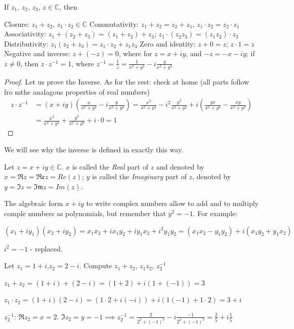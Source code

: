 \documentclass[12pt]{article}
\providecommand{\emphw}[1]{}%
\renewcommand{\emphw}[1]{{\textcolor{almostblack}{\emph{#1}}}}%
\begin{document}
\begin{proposition}
   If $z_1$, $z_2$, $z_3$, $z\in \mathbb{C}$, then

   \begin{enumerate}
      \ii Closure: $z_1+z_2$, $z_1\cdot z_2 \in\mathbb{C}$
      \ii Commutativity: $z_1+z_2 = z_2+z_1$, $z_1\cdot z_2 = z_2\cdot z_1$
      \ii Associativity: $z_1+(z_2+z_3) = (z_1+z_2)+z_3$; $z_1\cdot (z_2z_3)=(z_1z_2)\cdot z_3$
      \ii Distributivity: $z_1(z_2+z_3)=z_1\cdot z_2+z_1z_3$
      \ii Zero and identity: $z+0 = z$; $z\cdot 1 = z$
      \ii Negative and inverse: $z+(-z)=0$, where for $z=x+iy$, and $-z=-x-iy$; if $z\neq 0$, then $z\cdot z^{-1} = 1$, where $z^{-1} = \frac 1z=\frac {1}{x^2+y^2}-i\frac y{x^2+y^2}$
   \end{enumerate}
\end{proposition}
\begin{proof}
   Let us prove the Inverse. As for the rest: check at home (all parts follow fro mthe analagous properties of real numbers)
   \begin{align*} 
      z\cdot z^{-1} &= (x+iy)\left(\frac x{x^2+y^2}-i\frac y{x^2+y^2}\right) = \frac {x^2}{x^2+y^2}-i^2\frac {y^2}{x^2+y^2} + i\left(\frac {yx}{x^2+y^2}-\frac {xy}{x^2+y^2}\right) \\ 
      &=\frac {x^2}{x^2+y^2}+\frac {y^2}{x^2+y^2}+i\cdot 0 = 1
   \end{align*}
\end{proof}

We will see why the inverse is defined in exactly this way.
\begin{definition}
   Let $z=x+iy \in \mathbb{C}$. $x$ is called the \emphw{Real} part of $z$ and denoted by $x = \Re{z} = \mathfrak{Re} z = Re(z)$; $y$ is called the \emphw{Imaginary} part of $z$, denoted by $y=\Im z = \mathfrak{Im}z = Im(z)$.
\end{definition}

The algebraic form $x+iy$ to write complex numbers allow to add and to multiply comple numbers as polynomials, but remember that $y^2=-1$. For example:
\begin{example}
   $(x_1+iy_1)(x_2+iy_2) = x_1x_2+ix_1y_2+iy_1x_2+i^2y_1y_2 = (x_1x_2-y_1y_2) + i(x_1y_2 + y_1x_2)$
   
   $i^2 = -1$ - replaced.
\end{example}

\begin{example}
Let $z_1 = 1+i$,$z_2 = 2-i$. Compute $z_1+z_2$, $z_1z_2$, $z_2^{-1}$ 
\begin{soln}

   $z_1+z_2 = (1+i) + (2-i) = (1+2) + i(1+(-1)) = 3$
   
   $z_1\cdot z_2 = (1+i)(2-i) = (1\cdot 2+i(-i)) + i(1(-1)+1\cdot 2) = 3+i$
   
   $z_2^{-1}$: $\Re z_2 = x = 2$. $\Im z_2 = y = -1 \implies z_2^{-1} = \frac{2}{2^2 +(-1)^2} - i\frac {-1}{2^2+(-1)^2} = \frac 25 + i \frac 15$
\end{soln}
\end{example}
\end{document}

